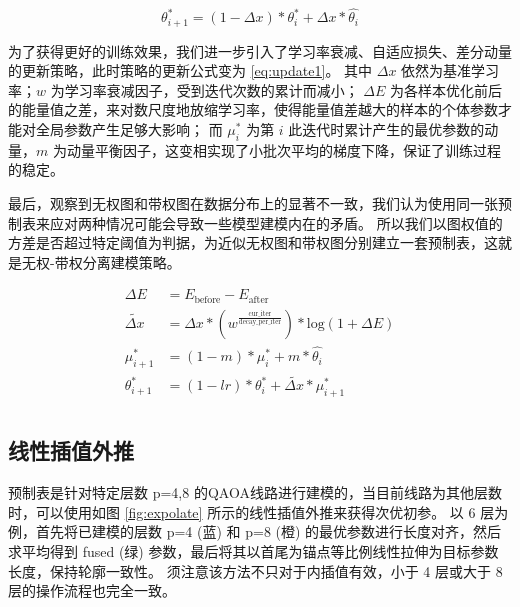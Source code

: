 \documentclass[withoutpreface,bwprint]{cumcmthesis}
\begin{document}
\begin{equation}
\theta_{i+1}^\ast = (1 - \Delta x) * \theta_i^\ast + \Delta x * \hat{\theta_i}
\label{eq:update0}
\end{equation}

为了获得更好的训练效果，我们进一步引入了学习率衰减、自适应损失、差分动量的更新策略，此时策略的更新公式变为 \ref{eq:update1}。
其中 $ \Delta x $ 依然为基准学习率；$ w $ 为学习率衰减因子，受到迭代次数的累计而减小；
$ \Delta E $ 为各样本优化前后的能量值之差，来对数尺度地放缩学习率，使得能量值差越大的样本的个体参数才能对全局参数产生足够大影响；
而 $ \mu_i^\ast $ 为第 $ i $ 此迭代时累计产生的最优参数的动量，$ m $ 为动量平衡因子，这变相实现了小批次平均的梯度下降，保证了训练过程的稳定。

最后，观察到无权图和带权图在数据分布上的显著不一致，我们认为使用同一张预制表来应对两种情况可能会导致一些模型建模内在的矛盾。
所以我们以图权值的方差是否超过特定阈值为判据，为近似无权图和带权图分别建立一套预制表，这就是无权-带权分离建模策略。

\begin{equation}
\begin{split}
\Delta E &= E_{\mathrm{before}} - E_{\mathrm{after}} \\
\tilde{\Delta x} &= \Delta x * (w^{\frac{\mathrm{cur\_iter}}{\mathrm{decay\_per\_iter}}}) * \mathrm{log}(1 + \Delta E) \\
\mu_{i+1}^\ast &= (1 - m) * \mu_i^\ast + m * \hat{\theta_i} \\
\theta_{i+1}^\ast &= (1 - lr) * \theta_i^\ast + \tilde{\Delta x} * \mu_{i+1}^\ast \\
\end{split}
\label{eq:update1}
\end{equation}

\subsection{线性插值外推}

预制表是针对特定层数 p=4,8 的QAOA线路进行建模的，当目前线路为其他层数时，可以使用如图 \ref{fig:expolate} 所示的线性插值外推来获得次优初参。
以 6 层为例，首先将已建模的层数 p=4 (蓝) 和 p=8 (橙) 的最优参数进行长度对齐，然后求平均得到 fused (绿) 参数，最后将其以首尾为锚点等比例线性拉伸为目标参数长度，保持轮廓一致性。
须注意该方法不只对于内插值有效，小于 4 层或大于 8 层的操作流程也完全一致。
\end{document}
